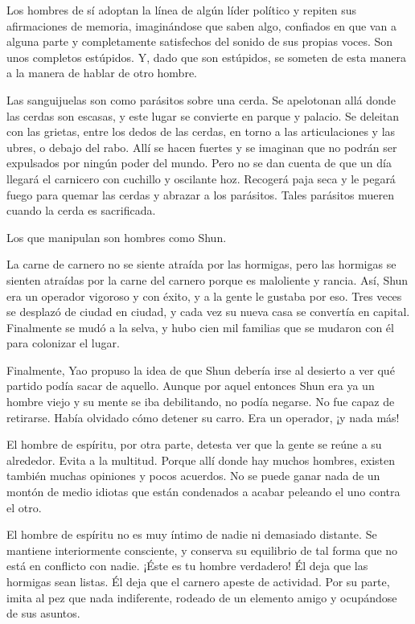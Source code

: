 \documentclass[book,b5paper,hidelinks,final]{memoir}
\begin{document}
	Los hombres de sí adoptan la línea de algún líder político y repiten sus
	afirmaciones de memoria, imaginándose que saben algo, confiados en que
	van a alguna parte y completamente satisfechos del sonido de sus propias
	voces. Son unos completos estúpidos. Y, dado que son estúpidos, se
	someten de esta manera a la manera de hablar de otro hombre.
	
	Las sanguijuelas son como parásitos sobre una cerda. Se apelotonan allá
	donde las cerdas son escasas, y este lugar se convierte en parque y
	palacio. Se deleitan con las grietas, entre los dedos de las cerdas, en
	torno a las articulaciones y las ubres, o debajo del rabo. Allí se hacen
	fuertes y se imaginan que no podrán ser expulsados por ningún poder del
	mundo. Pero no se dan cuenta de que un día llegará el carnicero con
	cuchillo y oscilante hoz. Recogerá paja seca y le pegará fuego para
	quemar las cerdas y abrazar a los parásitos. Tales parásitos mueren
	cuando la cerda es sacrificada.
	
	Los que manipulan son hombres como Shun.
	
	La carne de carnero no se siente atraída por las hormigas, pero las
	hormigas se sienten atraídas por la carne del carnero porque es
	maloliente y rancia. Así, Shun era un operador vigoroso y con éxito, y a
	la gente le gustaba por eso. Tres veces se desplazó de ciudad en ciudad,
	y cada vez su nueva casa se convertía en capital. Finalmente se mudó a
	la selva, y hubo cien mil familias que se mudaron con él para colonizar
	el lugar.
	
	Finalmente, Yao propuso la idea de que Shun debería irse al desierto a
	ver qué partido podía sacar de aquello. Aunque por aquel entonces Shun
	era ya un hombre viejo y su mente se iba debilitando, no podía negarse.
	No fue capaz de retirarse. Había olvidado cómo detener su carro. Era un
	operador, ¡y nada más!
	
	El hombre de espíritu, por otra parte, detesta ver que la gente se reúne
	a su alrededor. Evita a la multitud. Porque allí donde hay muchos
	hombres, existen también muchas opiniones y pocos acuerdos. No se puede
	ganar nada de un montón de medio idiotas que están condenados a acabar
	peleando el uno contra el otro.
	
	El hombre de espíritu no es muy íntimo de nadie ni demasiado distante.
	Se mantiene interiormente consciente, y conserva su equilibrio de tal
	forma que no está en conflicto con nadie. ¡Éste es tu hombre verdadero!
	Él deja que las hormigas sean listas. Él deja que el carnero apeste de
	actividad. Por su parte, imita al pez que nada indiferente, rodeado de
	un elemento amigo y ocupándose de sus asuntos.
	
\end{document}

